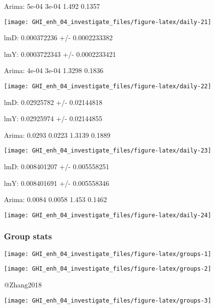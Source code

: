 \documentclass[
  10pt,
  a4paper,oneside]{article}
\begin{document}
Arima: 5e-04 3e-04 1.492 0.1357

\begin{center}\texttt{[image: GHI\_enh\_04\_investigate\_files/figure-latex/daily-21]} \end{center}

lmD: 0.000372236 +/- 0.0002233382

lmY: 0.0003722343 +/- 0.0002233421

Arima: 4e-04 3e-04 1.3298 0.1836

\begin{center}\texttt{[image: GHI\_enh\_04\_investigate\_files/figure-latex/daily-22]} \end{center}

lmD: 0.02925782 +/- 0.02144818

lmY: 0.02925974 +/- 0.02144855

Arima: 0.0293 0.0223 1.3139 0.1889

\begin{center}\texttt{[image: GHI\_enh\_04\_investigate\_files/figure-latex/daily-23]} \end{center}

lmD: 0.008401207 +/- 0.005558251

lmY: 0.008401691 +/- 0.005558346

Arima: 0.0084 0.0058 1.453 0.1462

\begin{center}\texttt{[image: GHI\_enh\_04\_investigate\_files/figure-latex/daily-24]} \end{center}

\newpage
\FloatBarrier

\hypertarget{group-stats}{%
\subsubsection{Group stats}\label{group-stats}}

\begin{center}\texttt{[image: GHI\_enh\_04\_investigate\_files/figure-latex/groups-1]} \end{center}

\begin{center}\texttt{[image: GHI\_enh\_04\_investigate\_files/figure-latex/groups-2]} \end{center}

@Zhang2018

\begin{center}\texttt{[image: GHI\_enh\_04\_investigate\_files/figure-latex/groups-3]} \end{center}
\end{document}

